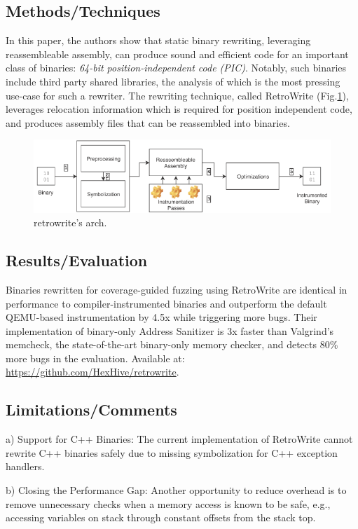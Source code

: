 \subsection{Methods/Techniques}
In this paper, the authors show that static binary rewriting, leveraging reassembleable assembly, can produce sound and efficient code for an important class of binaries: \emph{64-bit position-independent code (PIC)}. Notably, such binaries include third party shared libraries, the analysis of which is the most pressing use-case for such a rewriter. The rewriting technique, called RetroWrite (Fig.\ref{fig:retrowrite}), leverages relocation information which is required for position independent code, and produces assembly files that can be reassembled into binaries. 
\begin{figure}[h]
    \centering
    \includegraphics[width=\linewidth]{retrowrite.png} %
    \caption{retrowrite's arch.}	
    \label{fig:retrowrite}
\end{figure}
\subsection{Results/Evaluation}
Binaries rewritten for coverage-guided fuzzing using RetroWrite are identical in performance to compiler-instrumented binaries and outperform the default QEMU-based instrumentation by 4.5x while triggering more bugs. Their implementation of binary-only Address Sanitizer is 3x faster than Valgrind’s memcheck, the state-of-the-art binary-only memory checker, and detects 80\% more bugs in the evaluation.  Available at: \url{https://github.com/HexHive/retrowrite}.
\subsection{Limitations/Comments}
a) Support for C++ Binaries: The current implementation of RetroWrite cannot rewrite C++ binaries safely due to missing symbolization for C++ exception handlers. 

b) Closing the Performance Gap:  Another opportunity to reduce overhead is to remove unnecessary checks when a memory access is known to be safe, e.g., accessing variables on stack through constant offsets from the stack top. 

